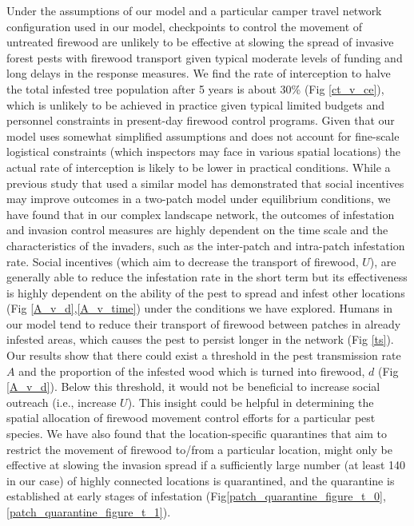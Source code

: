 Under the assumptions of our model and a particular camper travel network configuration used in our model, checkpoints to control the movement of untreated firewood are unlikely to be effective at slowing the spread of invasive forest pests with firewood transport given typical moderate levels of funding and long delays in the response measures. We find the rate of interception to halve the total infested tree population after 5 years is about 30\% (Fig \ref{ct_v_ce}), which is unlikely to be achieved in practice given typical limited budgets and personnel constraints in present-day firewood control programs. Given that our model uses somewhat simplified assumptions and does not account for fine-scale logistical constraints (which inspectors may face in various spatial locations) the actual rate of interception is likely to be lower in practical conditions. While a previous study \cite{barlow2014modelling} that used a similar model has demonstrated that social incentives may improve outcomes in a two-patch model under equilibrium conditions, we have found that in our complex landscape network, the outcomes of infestation and invasion control measures are highly dependent on the time scale and the characteristics of the invaders, such as the inter-patch and intra-patch infestation rate. Social incentives (which aim to decrease the transport of firewood, $U$), are generally able to reduce the infestation rate in the short term but its effectiveness is highly dependent on the ability of the pest to spread and infest other locations (Fig \ref{A_v_d},\ref{A_v_time}) under the conditions we have explored. Humans in our model tend to reduce their transport of firewood between patches in already infested areas, which causes the pest to persist longer in the network (Fig \ref{ts}). Our results show that there could exist a threshold in the pest transmission rate $A$ and the proportion of the infested wood which is turned into firewood, $d$ (Fig \ref{A_v_d}). Below this threshold, it would not be beneficial to increase social outreach (i.e., increase $U$). This insight could be helpful in determining the spatial allocation of firewood movement control efforts for a particular pest species. We have also found that the location-specific quarantines that aim to restrict the movement of firewood to/from a particular location, might only be effective at slowing the invasion spread if a sufficiently large number (at least 140 in our case) of highly connected locations is quarantined, and the quarantine is established at early stages of infestation (Fig\ref{patch_quarantine_figure_t_0},\ref{patch_quarantine_figure_t_1}).

